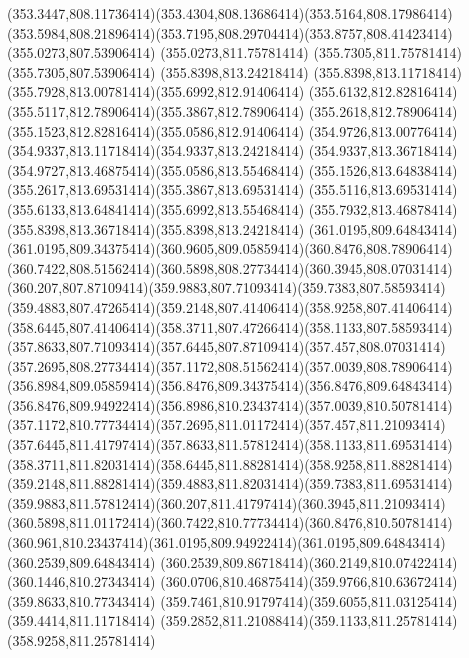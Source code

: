 {{	\curveto(353.3447,808.11736414)(353.4304,808.13686414)(353.5164,808.17986414)
	\curveto(353.5984,808.21896414)(353.7195,808.29704414)(353.8757,808.41423414)
	\closepath
	\moveto(355.0273,807.53906414)
	\lineto(355.0273,811.75781414)
	\lineto(355.7305,811.75781414)
	\lineto(355.7305,807.53906414)
	\closepath
	\moveto(355.8398,813.24218414)
	\curveto(355.8398,813.11718414)(355.7928,813.00781414)(355.6992,812.91406414)
	\curveto(355.6132,812.82816414)(355.5117,812.78906414)(355.3867,812.78906414)
	\curveto(355.2618,812.78906414)(355.1523,812.82816414)(355.0586,812.91406414)
	\curveto(354.9726,813.00776414)(354.9337,813.11718414)(354.9337,813.24218414)
	\curveto(354.9337,813.36718414)(354.9727,813.46875414)(355.0586,813.55468414)
	\curveto(355.1526,813.64838414)(355.2617,813.69531414)(355.3867,813.69531414)
	\curveto(355.5116,813.69531414)(355.6133,813.64841414)(355.6992,813.55468414)
	\curveto(355.7932,813.46878414)(355.8398,813.36718414)(355.8398,813.24218414)
	\closepath
	\moveto(361.0195,809.64843414)
	\curveto(361.0195,809.34375414)(360.9605,809.05859414)(360.8476,808.78906414)
	\curveto(360.7422,808.51562414)(360.5898,808.27734414)(360.3945,808.07031414)
	\curveto(360.207,807.87109414)(359.9883,807.71093414)(359.7383,807.58593414)
	\curveto(359.4883,807.47265414)(359.2148,807.41406414)(358.9258,807.41406414)
	\curveto(358.6445,807.41406414)(358.3711,807.47266414)(358.1133,807.58593414)
	\curveto(357.8633,807.71093414)(357.6445,807.87109414)(357.457,808.07031414)
	\curveto(357.2695,808.27734414)(357.1172,808.51562414)(357.0039,808.78906414)
	\curveto(356.8984,809.05859414)(356.8476,809.34375414)(356.8476,809.64843414)
	\curveto(356.8476,809.94922414)(356.8986,810.23437414)(357.0039,810.50781414)
	\curveto(357.1172,810.77734414)(357.2695,811.01172414)(357.457,811.21093414)
	\curveto(357.6445,811.41797414)(357.8633,811.57812414)(358.1133,811.69531414)
	\curveto(358.3711,811.82031414)(358.6445,811.88281414)(358.9258,811.88281414)
	\curveto(359.2148,811.88281414)(359.4883,811.82031414)(359.7383,811.69531414)
	\curveto(359.9883,811.57812414)(360.207,811.41797414)(360.3945,811.21093414)
	\curveto(360.5898,811.01172414)(360.7422,810.77734414)(360.8476,810.50781414)
	\curveto(360.961,810.23437414)(361.0195,809.94922414)(361.0195,809.64843414)
	\closepath
	\moveto(360.2539,809.64843414)
	\curveto(360.2539,809.86718414)(360.2149,810.07422414)(360.1446,810.27343414)
	\curveto(360.0706,810.46875414)(359.9766,810.63672414)(359.8633,810.77343414)
	\curveto(359.7461,810.91797414)(359.6055,811.03125414)(359.4414,811.11718414)
	\curveto(359.2852,811.21088414)(359.1133,811.25781414)(358.9258,811.25781414)
}}
